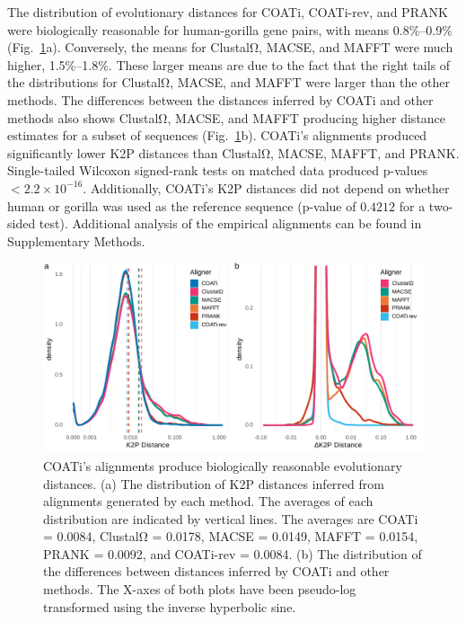 \documentclass[12pt,letterpaper]{article}
\begin{document}
The distribution of evolutionary distances for COATi, COATi-rev, and PRANK were biologically reasonable  for human-gorilla gene pairs, with means 0.8\%--0.9\% (Fig.~\ref{fig:k2p-empirical}a). Conversely, the means for ClustalΩ, MACSE, and MAFFT were much higher, 1.5\%--1.8\%. These larger means are due to the fact that the right tails of the distributions for ClustalΩ, MACSE, and MAFFT were larger than the other methods. The differences between the distances inferred by COATi and other methods also shows ClustalΩ, MACSE, and MAFFT producing higher distance estimates for a subset of sequences (Fig.~\ref{fig:k2p-empirical}b).
%
COATi's alignments produced significantly lower K2P distances than ClustalΩ, MACSE, MAFFT, and PRANK. Single-tailed Wilcoxon signed-rank tests on matched data produced p-values $< 2.2\times10^{-16}$. Additionally, COATi's K2P distances did not depend on whether human or gorilla was used as the reference sequence (p-value of $0.4212$ for a two-sided test). Additional analysis of the empirical alignments can be found in Supplementary Methods.


\begin{figure}[h!]
    \centering%
    \includegraphics{figures/fig-k2p-empirical.pdf}
    \par
    \caption{COATi's alignments produce biologically reasonable evolutionary distances. (a) The distribution of K2P distances inferred from alignments generated by each method. The averages of each distribution are indicated by vertical lines. The averages are COATi = 0.0084, ClustalΩ = 0.0178, MACSE = 0.0149, MAFFT = 0.0154, PRANK = 0.0092, and COATi-rev = 0.0084. (b) The distribution of the differences between distances inferred by COATi and other methods. The X-axes of both plots have been pseudo-log transformed using the inverse hyperbolic sine.\label{fig:k2p-empirical}}
\end{figure}
\end{document}
